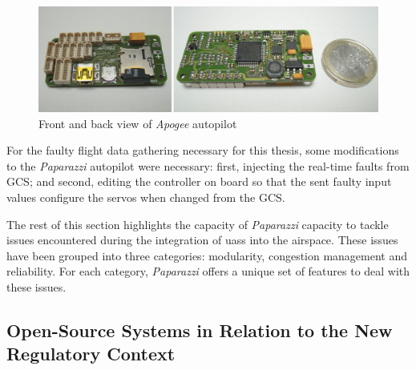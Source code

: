 \begin{figure}
\begin{center}
\includegraphics[width=14cm]{figures/apogeePaparazzi}
\caption{Front and back view of \emph{Apogee} autopilot} 
\label{fig:apogeePaparazzi}
\end{center}
\end{figure}

For the faulty flight data gathering necessary for this thesis, some modifications to the \emph{Paparazzi} autopilot were necessary: first, injecting the real-time faults from GCS; and  second, editing the controller on board so that the sent faulty input values configure the servos when changed from the GCS. 

The rest of this section highlights the capacity of \emph{Paparazzi} capacity to tackle issues encountered during the integration of \gls{uas}s into the airspace. These issues have been grouped into three categories: modularity, congestion management and reliability. For each category, \emph{Paparazzi} offers a unique set of features to deal with these issues.

\subsection{Open-Source Systems in Relation to the New Regulatory Context}

